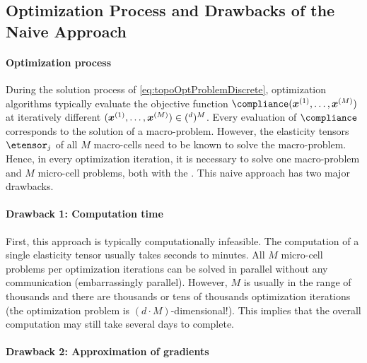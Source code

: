 \subsection{Optimization Process and Drawbacks of the Naive Approach}
\label{sec:613optimization}

\paragraph{Optimization process}

During the solution process of \eqref{eq:topoOptProblemDiscrete},
optimization algorithms typically
evaluate the objective function $\compliance(\*x^{(1)}, \dotsc, \*x^{(M)})$
at iteratively different 
$(\*x^{(1)}, \dotsc, \*x^{(M)}) \in (\real^d)^M$.
Every evaluation of $\compliance$ corresponds to the solution of a
macro-problem.
However, the elasticity tensors $\etensor_j$ of all $M$ macro-cells
need to be known to solve the macro-problem.
Hence, in every optimization iteration, it is necessary to solve
one macro-problem and $M$ micro-cell problems,
both with the \fem.
This naive approach has two major drawbacks.

\paragraph{Drawback 1: Computation time}

First, this approach is typically computationally infeasible.
The computation of a single elasticity tensor usually takes seconds to
minutes.
All $M$ micro-cell problems per optimization iterations
can be solved in parallel without any
communication (embarrassingly parallel).
However, $M$ is usually in the range of thousands and
there are thousands or tens of thousands optimization iterations
(the optimization problem is $(d \cdot M)$-dimensional!).
This implies that the overall computation may still take
several days to complete.

\paragraph{Drawback 2: Approximation of gradients}

